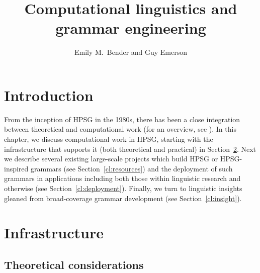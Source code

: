 \documentclass[output=paper,biblatex,babelshorthands,newtxmath,draftmode,colorlinks,citecolor=brown]{langscibook}
\author{Emily M.\ Bender\orcid{0000-0001-5384-6227}\affiliation{University of Washington} and Guy Emerson\orcid{0000-0002-3136-9682}\affiliation{University of Cambridge}}
\title{Computational linguistics and grammar engineering}
\begin{document}
\maketitle

\label{chap-cl}

\section{Introduction}

From the inception of HPSG in the 1980s, there has been a close integration between theoretical and
computational work (for an overview, see ).  In this chapter, we
discuss computational work in HPSG, starting with the infrastructure that supports it (both
theoretical and practical) in Section~\ref{cl:infrastructure}.  Next we describe several existing
large-scale projects which build HPSG or HPSG-inspired grammars (see Section~\ref{cl:resources}) and
the deployment of such grammars in applications including both those within linguistic research and
otherwise (see Section~\ref{cl:deployment}).  Finally, we turn to linguistic insights gleaned from
broad-coverage grammar development (see Section~\ref{cl:insight}).

\section{Infrastructure}
\label{cl:infrastructure}

\subsection{Theoretical considerations}
\label{cl:theoretical}
\end{document}
